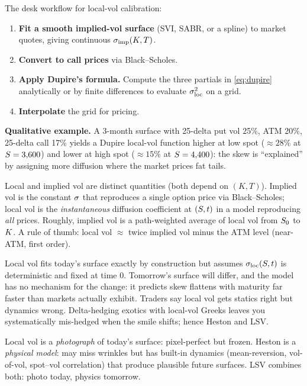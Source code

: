 The desk workflow for local-vol calibration:
\begin{enumerate}
  \item \textbf{Fit a smooth implied-vol surface} (SVI, SABR, or a
    spline) to market quotes, giving continuous
    $\sigma_{\text{imp}}(K, T)$.
  \item \textbf{Convert to call prices} via Black--Scholes.
  \item \textbf{Apply Dupire's formula.} Compute the three partials
    in \cref{eq:dupire} analytically or by finite differences to
    evaluate $\sigma_{\text{loc}}^2$ on a grid.
  \item \textbf{Interpolate} the grid for pricing.
\end{enumerate}

\noindent
\textbf{Qualitative example.} A 3-month surface with 25-delta put vol
25\%, ATM 20\%, 25-delta call 17\% yields a Dupire local-vol function
higher at low spot ($\approx 28\%$ at $S=3{,}600$) and lower at
high spot ($\approx 15\%$ at $S=4{,}400$): the skew is ``explained''
by assigning more diffusion where the market prices fat tails.

\begin{keyfactbox}
Local and implied vol are distinct quantities (both depend on
$(K,T)$). Implied vol is the constant $\sigma$ that reproduces a
single option price via Black--Scholes; local vol is the
\emph{instantaneous} diffusion coefficient at $(S,t)$ in a model
reproducing \emph{all} prices. Roughly, implied vol is a
path-weighted average of local vol from $S_0$ to $K$. A
\citet{dupire1994pricing} rule of thumb: local vol $\approx$ twice
implied vol minus the ATM level (near-ATM, first order).
\end{keyfactbox}

\begin{pitfallbox}
\label{pitfall:local_vol_static}
Local vol fits today's surface exactly by construction but assumes
$\sigma_{\text{loc}}(S,t)$ is deterministic and fixed at time 0.
Tomorrow's surface will differ, and the model has no mechanism for
the change: it predicts skew flattens with maturity far faster than
markets actually exhibit. Traders say local vol gets statics right
but dynamics wrong. Delta-hedging exotics with local-vol Greeks
leaves you systematically mis-hedged when the smile shifts; hence
Heston and LSV.
\end{pitfallbox}

\begin{intuitionbox}
Local vol is a \emph{photograph} of today's surface: pixel-perfect
but frozen. Heston is a \emph{physical model}: may miss wrinkles
but has built-in dynamics (mean-reversion, vol-of-vol, spot--vol
correlation) that produce plausible future surfaces. LSV combines
both: photo today, physics tomorrow.
\end{intuitionbox}


